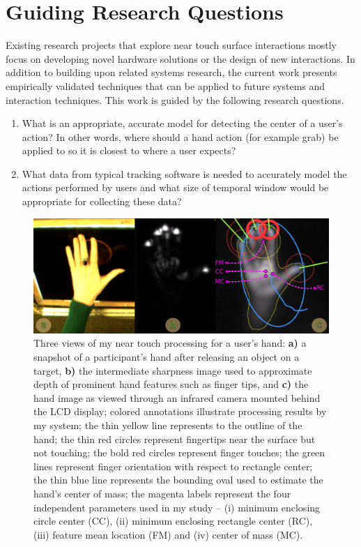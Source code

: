 \section{Guiding Research Questions}
Existing research projects that explore near touch surface interactions mostly focus on developing novel hardware solutions or the design of new interactions.
In addition to building upon related systems research, the current work presents empirically validated techniques that can be applied to future systems and interaction techniques.  
This work is guided by the following research questions.  
\begin{enumerate}
\item What is an appropriate, accurate model for detecting the center of a user's  action? 
In other words, where should a hand action (for example grab) be applied to so it is closest to where a user expects?
\item What data from typical tracking software is needed to accurately model the actions performed by users and what size of temporal window would be appropriate for collecting these data?
\end{enumerate}

\begin{figure}[t!]
 \centering
 \includegraphics[width=6in]{./img/teaser/teaser.pdf}
 \caption[Three views of my near touch processing for a user's hand]{ Three views of my near touch processing for a user's hand:  
\textbf{a)} a snapshot of a participant's hand after releasing an object on a target,
\textbf{b)} the intermediate sharpness image used to approximate depth of prominent hand features such as finger tips, and
\textbf{c)} the hand image as viewed through an infrared camera mounted behind the LCD display; 
colored annotations illustrate processing results by my system; the thin yellow line represents to the outline of the hand; 
the thin red circles represent fingertips near the surface but not touching; the bold red circles represent finger touches; 
the green lines represent finger orientation with respect to rectangle center; the thin blue line represents the bounding oval used to estimate the hand's center of mass; 
the magenta labels represent the four independent parameters used in my study -- (i) minimum enclosing circle center (CC), (ii) minimum enclosing rectangle center (RC), (iii) feature mean location (FM) and (iv) center of mass (MC).
}
 \label{fig:teaser}
\end{figure}

